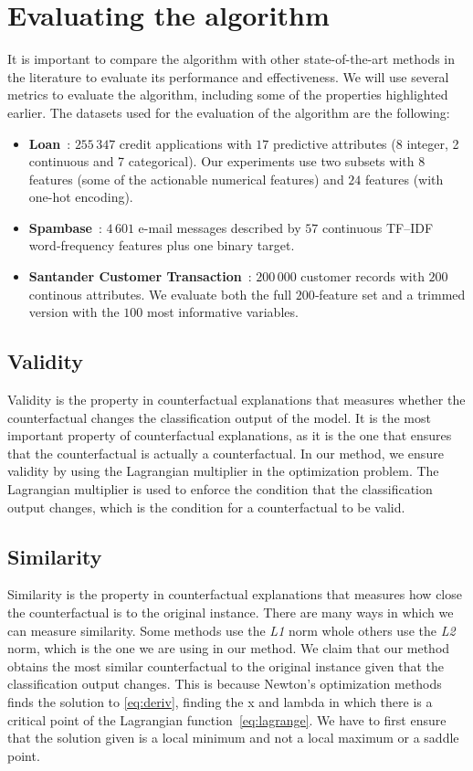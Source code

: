 \documentclass[12pt]{extarticle}
\numberwithin{equation}{section}
\begin{document}
\section{Evaluating the algorithm}\label{sec:evaluation}
It is important to compare the algorithm with other state-of-the-art methods in the literature to evaluate its performance and effectiveness. We will use several metrics to evaluate the algorithm, including some of the properties highlighted earlier. The datasets used for the evaluation of the algorithm are the following:
\begin{itemize}
  \item \textbf{Loan}~\cite{kaggleLoan1}: $255\,347$ credit
        applications with $17$ predictive attributes (8 integer, 2 continuous and 7 categorical).  Our experiments use two subsets with $8$ features (some of the actionable numerical features) and $24$ features (with one-hot encoding).
  \item \textbf{Spambase}~\cite{spambase}: $4\,601$ e-mail messages described by $57$ continuous TF–IDF word‐frequency features plus one binary target. 
  \item \textbf{Santander Customer Transaction}~\cite{santander}:
        $200\,000$ customer records with $200$ continous attributes.
        We evaluate both the full $200$‐feature set and a trimmed version with
        the $100$ most informative variables.
\end{itemize}

\subsection{Validity}\label{sec:validity}
Validity is the property in counterfactual explanations that measures whether the counterfactual changes the classification output of the model. It is the most important property of counterfactual explanations, as it is the one that ensures that the counterfactual is actually a counterfactual. In our method, we ensure validity by using the Lagrangian multiplier in the optimization problem. The Lagrangian multiplier is used to enforce the condition that the classification output changes, which is the condition for a counterfactual to be valid.

\subsection{Similarity}\label{sec:similarity}
Similarity is the property in counterfactual explanations that measures how close the counterfactual is to the original instance. There are many ways in which we can measure similarity. Some methods use the  \emph{L1} norm whole others use the \emph{L2} norm, which is the one we are using in our method. We claim that our method obtains the most similar counterfactual to the original instance given that the classification output changes. This is because Newton's optimization methods finds the solution to \eqref{eq:deriv}, finding the x and lambda in which there is a critical point of the Lagrangian function~\eqref{eq:lagrange}. We have to first ensure that the solution given is a local minimum
and not a local maximum or a saddle point. 
\end{document}
